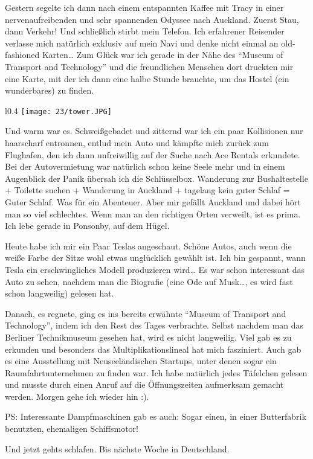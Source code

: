 Gestern segelte ich dann nach einem entspannten Kaffee mit Tracy in
einer nervenaufreibenden und sehr spannenden Odyssee nach Auckland.
Zuerst Stau, dann Verkehr! Und schließlich stirbt mein Telefon. Ich
erfahrener Reisender verlasse mich natürlich exklusiv auf mein Navi und
denke nicht einmal an old-fashioned Karten\ldots{} Zum Glück war ich
gerade in der Nähe des ``Museum of Transport and Technology'' und die
freundlichen Menschen dort druckten mir eine Karte, mit der ich dann
eine halbe Stunde brauchte, um das Hostel (ein wunderbares) zu finden.

\begin{wrapfigure}{l}{0.4\textwidth}
  \centering
  \texttt{[image: 23/tower.JPG]}
\end{wrapfigure}
Und warm war es. Schweißgebadet und zitternd war ich ein paar
Kollisionen nur haarscharf entronnen, entlud mein Auto und kämpfte
mich zurück zum Flughafen, den ich dann unfreiwillig auf der Suche
nach Ace Rentals erkundete. Bei der Autovermietung war natürlich schon
keine Seele mehr und in einem Augenblick der Panik übersah ich die
Schlüsselbox.  Wanderung zur Bushaltestelle + Toilette suchen +
Wanderung in Auckland + tagelang kein guter Schlaf = Guter Schlaf. Was
für ein Abenteuer. Aber mir gefällt Auckland und dabei hört man so
viel schlechtes. Wenn man an den richtigen Orten verweilt, ist es
prima. Ich lebe gerade in Ponsonby, auf dem Hügel.

Heute habe ich mir ein Paar Teslas angeschaut. Schöne Autos, auch wenn
die weiße Farbe der Sitze wohl etwas unglücklich gewählt ist. Ich bin
gespannt, wann Tesla ein erschwingliches Modell produzieren wird\ldots{}
Es war schon interessant das Auto zu sehen, nachdem man die Biografie
(eine Ode auf Musk\ldots, es wird fast schon langweilig) gelesen hat.

Danach, es regnete, ging es ins bereits erwähnte ``Museum of Transport
and Technology'', indem ich den Rest des Tages verbrachte. Selbst
nachdem man das Berliner Technikmuseum gesehen hat, wird es nicht
langweilig.  Viel gab es zu erkunden und besonders das
Multiplikationslineal hat mich fasziniert. Auch gab es eine
Ausstellung mit Neuseeländischen Startups, unter denen sogar ein
Raumfahrtunternehmen zu finden war. Ich habe natürlich jedes Täfelchen
gelesen und musste durch einen Anruf auf die Öffnungszeiten aufmerksam
gemacht werden. Morgen gehe ich wieder hin :).

PS: Interessante Dampfmaschinen gab es auch: Sogar einen, in einer
Butterfabrik benutzten, ehemaligen Schiffsmotor!

Und jetzt gehts schlafen. Bis nächste Woche in Deutschland.
